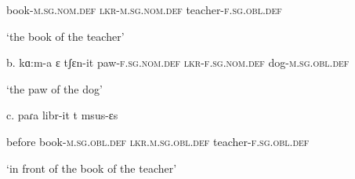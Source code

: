 \documentclass[output=paper]{langsci/langscibook}
\begin{document}
\begin{styleparagrafo}
    book-\textsc{m.sg.nom.def}  \textsc{lkr-m.sg.nom.def}   teacher-\textsc{f.sg.obl.def} 
\end{styleparagrafo}

\begin{styleparagrafo}
  ‘the book of the teacher’ 
\end{styleparagrafo}

\begin{styleparagrafo}
b.  kɑ:m-a      ɛ          tʃɛn-it                paw-\textsc{f.sg.nom.def}   \textsc{lkr-f.sg.nom.def}  dog-\textsc{m.sg.obl.def}  
\end{styleparagrafo}

\begin{styleparagrafo}
‘the paw of the dog’ 
\end{styleparagrafo}

\begin{styleSfondomedioiColorexxi}
  c.  paɾa     libr-it       t       msus-ɛs
\end{styleSfondomedioiColorexxi}

\begin{styleSfondomedioiColorexxi}
    before   book-\textsc{m.sg.obl.def}  \textsc{lkr.m.sg.obl.def}  teacher-\textsc{f.sg.obl.def}
\end{styleSfondomedioiColorexxi}

\begin{styleSfondomedioiColorexxi}
    ‘in front of the book of the teacher’   
\end{styleSfondomedioiColorexxi}
\end{document}
